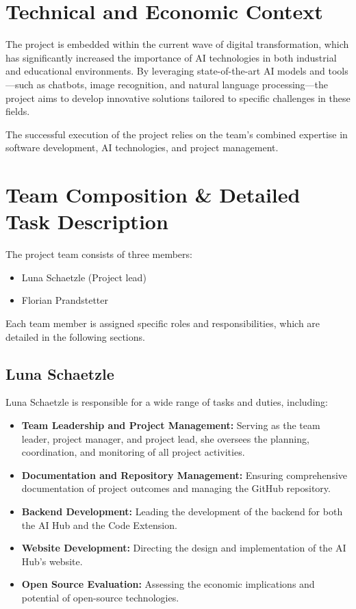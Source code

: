 \section{Technical and Economic Context}

The project is embedded within the current wave of digital transformation, which has significantly increased the importance of AI technologies in both industrial and educational environments. By leveraging state-of-the-art AI models and tools—such as chatbots, image recognition, and natural language processing—the project aims to develop innovative solutions tailored to specific challenges in these fields.

The successful execution of the project relies on the team’s combined expertise in software development, AI technologies, and project management.

\section{Team Composition & Detailed Task Description}

The project team consists of three members:
\begin{itemize}
    \item Luna Schaetzle (Project lead)
    \item Florian Prandstetter
\end{itemize}

Each team member is assigned specific roles and responsibilities, which are detailed in the following sections.

\subsection{Luna Schaetzle}

Luna Schaetzle is responsible for a wide range of tasks and duties, including:
\begin{itemize}
    \item \textbf{Team Leadership and Project Management:} Serving as the team leader, project manager, and project lead, she oversees the planning, coordination, and monitoring of all project activities.
    \item \textbf{Documentation and Repository Management:} Ensuring comprehensive documentation of project outcomes and managing the GitHub repository.
    \item \textbf{Backend Development:} Leading the development of the backend for both the AI Hub and the Code Extension.
    \item \textbf{Website Development:} Directing the design and implementation of the AI Hub's website.
    \item \textbf{Open Source Evaluation:} Assessing the economic implications and potential of open-source technologies.
\end{itemize}


